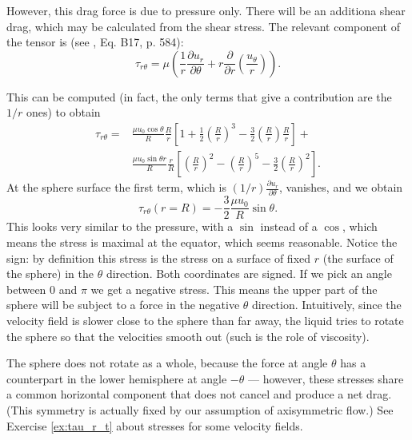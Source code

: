 However, this drag force is due to pressure only. There will be an
additiona shear drag, which may be calculated from the shear stress.
The relevant component of the tensor is (see \cite{white1991viscous},
Eq. B17, p. 584):
\begin{equation}
  \label{eq:tau_r_th}
  \tau_{r\theta} = \mu \left(
    \frac1r
    \frac{\partial u_r}{\partial \theta} +
    r \frac{\partial }{\partial r} \left( \frac{u_\theta}{r}\right) 
  \right) .
\end{equation}

This can be computed (in fact, the only terms that give a contribution
are the $1/r$ ones) to obtain
\begin{align*}
  \tau_{r\theta}  =
  &
    \frac{\mu u_0 \cos\theta  }{R}
    \frac{ R  }{r}
    \left[
    1+
    \frac12   \left(\frac{R}{r}\right)^3 -
    \frac32   \left(\frac{R}{r}\right)
    \frac{R}{r}
    \right] + \\
  &  \frac{\mu u_0 \sin\theta r }{R}
    \frac{ r  }{R}
    \left[
    \left(\frac{R}{r}\right)^2 -
    \left(\frac{R}{r}\right)^5 -
    \frac32   \left(\frac{R}{r}\right)^2
    \right] .
\end{align*}
At the sphere surface the first term, which is
$ (1/r) \frac{\partial u_r}{\partial \theta} $, vanishes, and we
obtain
\[
  \tau_{r\theta} (r=R) =  - \frac32 \frac{\mu u_0}{R}  \sin\theta .
\]
This looks very similar to the pressure, with a $\sin$ instead of a
$\cos$, which means the stress is maximal at the equator, which seems
reasonable. Notice the sign: by definition this stress is the stress
on a surface of fixed $r$ (the surface of the sphere) in the $\theta$
direction. Both coordinates are signed. If we pick an angle between
$0$ and $\pi$ we get a negative stress. This means the upper part of
the sphere will be subject to a force in the negative $\theta$
direction. Intuitively, since the velocity field is slower close to
the sphere than far away, the liquid tries to rotate the sphere so
that the velocities smooth out (such is the role of viscosity).

The sphere does not rotate as a whole, because the force at angle
$\theta$ has a counterpart in the lower hemisphere at angle $-\theta$
--- however, these stresses share a common horizontal component that
does not cancel and produce a net drag. (This symmetry is actually
fixed by our assumption of axisymmetric flow.) See Exercise
\ref{ex:tau_r_t} about stresses for some velocity fields.

